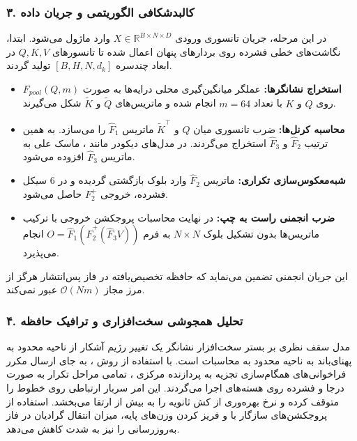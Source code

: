 \subsubsection*{۳. کالبدشکافی الگوریتمی و جریان داده }
در این مرحله، جریان تانسوری ورودی $X \in \mathbb{R}^{B \times N \times D}$ وارد ماژول می‌شود. ابتدا، نگاشت‌های خطی  فشرده روی بردارهای پنهان اعمال شده تا تانسورهای $Q, K, V$ در ابعاد چندسره $[B, H, N, d_k]$ تولید گردند. 
\begin{itemize}
    \item \textbf{استخراج نشانگرها:} عملگر میانگین‌گیری محلی درایه‌ها به صورت $F_{pool}(Q, m)$ روی $Q$ و $K$ با تعداد $m=64$ انجام شده و ماتریس‌های $\tilde{Q}$ و $\tilde{K}$ شکل می‌گیرند.
    \item \textbf{محاسبه کرنل‌ها:} ضرب تانسوری میان $Q$ و $\tilde{K}^\top$ ماتریس $\hat{F}_1$ را می‌سازد. به همین ترتیب $\hat{F}_2$ و $\hat{F}_3$ استخراج می‌گردند. در مدل‌های دیکودر مانند ، ماسک علی  به ماتریس $\hat{F}_3$ افزوده می‌شود.
    \item \textbf{شبه‌معکوس‌سازی تکراری:} ماتریس $\hat{F}_2$ وارد بلوک بازگشتی  گردیده و در $6$ سیکل فشرده، خروجی $F_2^+$ حاصل می‌شود.
    \item \textbf{ضرب انجمنی راست به چپ:} در نهایت محاسبات پروجکشن خروجی با ترکیب ماتریس‌ها بدون تشکیل بلوک $N \times N$ به فرم $O = \hat{F}_1 (\hat{F}_2^+ (\hat{F}_3 V))$ انجام می‌پذیرد.
\end{itemize}
این جریان انجمنی تضمین می‌نماید که حافظه تخصیص‌یافته در فاز پس‌انتشار  هرگز از مرز مجاز $\mathcal{O}(N m)$ عبور نمی‌کند.

\subsubsection*{۴. تحلیل همجوشی سخت‌افزاری و ترافیک حافظه }
مدل سقف نظری  بر بستر سخت‌افزار  نشانگر یک تغییر رژیم آشکار از ناحیه محدود به پهنای‌باند  به ناحیه محدود به محاسبات  است. با استفاده از روش ، به جای ارسال مکرر فراخوانی‌های همگام‌سازی تجزیه  به پردازنده مرکزی ، تمامی مراحل تکرار به صورت درجا  و فشرده روی هسته‌های  اجرا می‌گردند.
این امر سربار ارتباطی روی خطوط  را متوقف کرده و نرخ بهره‌وری از کش ثانویه  را به بیش از  ارتقا می‌بخشد. استفاده از پروجکشن‌های سازگار با  و فریز کردن وزن‌های پایه، میزان انتقال گرادیان در فاز به‌روزرسانی  را نیز به شدت کاهش می‌دهد.

